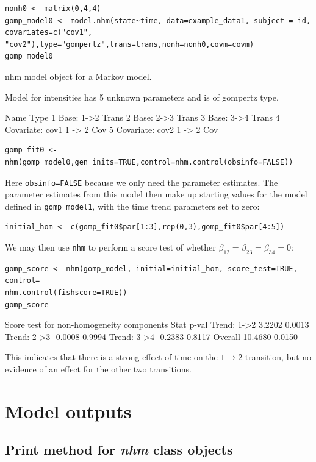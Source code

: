 \documentclass{article}
\numberwithin{equation}{section}
\begin{document}
\begin{verbatim}
nonh0 <- matrix(0,4,4)
gomp_model0 <- model.nhm(state~time, data=example_data1, subject = id, covariates=c("cov1",
"cov2"),type="gompertz",trans=trans,nonh=nonh0,covm=covm)
gomp_model0
\end{verbatim}
\begin{verbout}
nhm model object for a Markov model.

Model for intensities has 5 unknown parameters and is of gompertz type.
 
                    Name  Type
1             Base: 1->2 Trans
2             Base: 2->3 Trans
3             Base: 3->4 Trans
4 Covariate: cov1 1 -> 2   Cov
5 Covariate: cov2 1 -> 2   Cov
\end{verbout}
\begin{verbatim}
gomp_fit0 <- nhm(gomp_model0,gen_inits=TRUE,control=nhm.control(obsinfo=FALSE))
\end{verbatim}
Here \verb!obsinfo=FALSE! because we only need the parameter estimates. The parameter estimates from this model then make up starting values for the model defined in \verb!gomp_model1!, with the time trend parameters set to zero:
\begin{verbatim}
initial_hom <- c(gomp_fit0$par[1:3],rep(0,3),gomp_fit0$par[4:5])
\end{verbatim}
We may then use \verb!nhm! to perform a score test of whether $\beta_{12} = \beta_{23} = \beta_{34} =0$:
\begin{verbatim}
gomp_score <- nhm(gomp_model, initial=initial_hom, score_test=TRUE, control=
nhm.control(fishscore=TRUE))
gomp_score
\end{verbatim}
\begin{verbout}
Score test for non-homogeneity components 
               Stat  p-val
Trend: 1->2  3.2202 0.0013
Trend: 2->3 -0.0008 0.9994
Trend: 3->4 -0.2383 0.8117
Overall     10.4680 0.0150
\end{verbout}
This indicates that there is a strong effect of time on the $1 \rightarrow 2$ transition, but no evidence of an effect for the other two transitions.

\section{Model outputs}

\subsection{Print method for {\it nhm} class objects}
\end{document}
